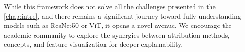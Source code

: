 While this framework does not solve all the challenges presented in the \autoref{chap:intro}, and there remains a significant journey toward fully understanding models such as ResNet50 or ViT, it opens a novel avenue. We encourage the academic community to explore the synergies between attribution methods, concepts, and feature visualization for deeper explainability.


